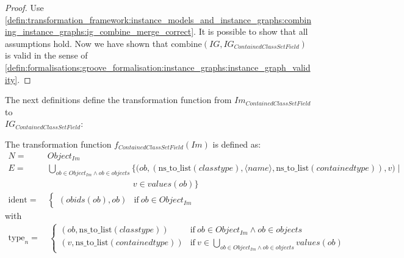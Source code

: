 \begin{proof}
Use \cref{defin:transformation_framework:instance_models_and_instance_graphs:combining_instance_graphs:ig_combine_merge_correct}. It is possible to show that all assumptions hold. Now we have shown that $\mathrm{combine}(IG, IG_{ContainedClassSetField})$ is valid in the sense of \cref{defin:formalisations:groove_formalisation:instance_graphs:instance_graph_validity}.
\end{proof}

The next definitions define the transformation function from $Im_{ContainedClassSetField}$ to \\$IG_{ContainedClassSetField}$:

\begin{defin}
\label{defin:library_of_transformations:instance_level_transformations:contained_class_set_field_values:imod_contained_class_set_field_to_ig_contained_class_set_field_as_edge_type}
The transformation function $f_{ContainedClassSetField}(Im)$ is defined as:
\begin{align*}
N =\ & Object_{Im}\\
E =\ & \bigcup_{ob \in Object_{Im} \land ob \in objects} \big\{\big(ob, (\mathrm{ns\_\!to\_\!list}(classtype), \langle name \rangle, \mathrm{ns\_\!to\_\!list}(containedtype)), v\big) \mid\\&\qquad\qquad\qquad\qquad\qquad v \in values(ob) \big\} \\
\mathrm{ident} =\ & \begin{cases}
    (obids(ob), ob) & \mathrm{if }\ ob \in Object_{Im}
\end{cases}
\end{align*}
with
\begin{align*}
\mathrm{type}_n =\ & \begin{cases}
    (ob, \mathrm{ns\_\!to\_\!list}(classtype)) & \mathrm{if }\ ob \in Object_{Im} \land ob \in objects\\
    (v, \mathrm{ns\_\!to\_\!list}(containedtype)) & \mathrm{if }\ v \in \bigcup_{ob \in Object_{Im} \land ob \in objects} values(ob)
\end{cases}
\end{align*}
\end{defin}

